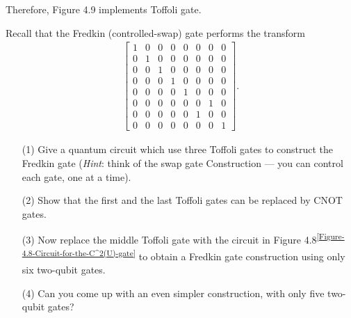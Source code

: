 \documentclass[en]{sol-man}
\begin{document}
\begin{pf}
    Therefore, Figure 4.9 implements Toffoli gate.
\end{pf}

\begin{exe}
    Recall that the Fredkin (controlled-swap) gate performs the transform
    \begin{align}
        \begin{bmatrix}
            1&0&0&0&0&0&0&0\\
            0&1&0&0&0&0&0&0\\
            0&0&1&0&0&0&0&0\\
            0&0&0&1&0&0&0&0\\
            0&0&0&0&1&0&0&0\\
            0&0&0&0&0&0&1&0\\
            0&0&0&0&0&1&0&0\\
            0&0&0&0&0&0&0&1
        \end{bmatrix}.
    \end{align}
    \begin{itemize}
        \item[(1)] Give a quantum circuit which use three Toffoli gates to construct the Fredkin gate (\emph{Hint}: think of the swap gate Construction --- you can control each gate, one at a time).
        \item[(2)] Show that the first and the last Toffoli gates can be replaced by CNOT gates.
        \item[(3)] Now replace the middle Toffoli gate with the circuit in Figure 4.8\textsuperscript{\ref{Figure-4.8-Circuit-for-the-C^2(U)-gate}} to obtain a Fredkin gate construction using only six two-qubit gates.
        \item[(4)] Can you come up with an even simpler construction, with only five two-qubit gates?
    \end{itemize}
\end{exe}
\end{document}
